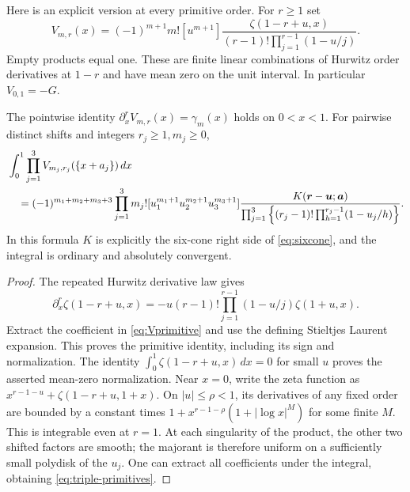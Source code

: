 Here is an explicit version at every primitive order.  For $r\ge1$ set
\begin{equation}\label{eq:Vprimitive}
 V_{m,r}(x)=(-1)^{m+1}m![u^{m+1}]
 \frac{\zeta(1-r+u,x)}{(r-1)!\prod_{j=1}^{r-1}(1-u/j)}.
\end{equation}
Empty products equal one.  These are finite linear combinations of
Hurwitz order derivatives at $1-r$ and have mean zero on the unit
interval.  In particular $V_{0,1}=-G$.
\begin{corollary}
\label{cor:triple-primitives}
The pointwise identity $\partial_x^rV_{m,r}(x)=\gamma_m(x)$ holds on
$0<x<1$.  For pairwise distinct shifts and integers $r_j\ge1,m_j\ge0$,
\begin{align}\label{eq:triple-primitives}
 &\int_0^1\prod_{j=1}^{3}V_{m_j,r_j}(\{x+a_j\})\,dx\notag\\
 &\quad=(-1)^{m_1+m_2+m_3+3}\prod_{j=1}^{3}m_j!
 [u_1^{m_1+1}u_2^{m_2+1}u_3^{m_3+1}]
 \frac{K(\boldsymbol r-\boldsymbol u;\boldsymbol a)}
 {\prod_{j=1}^{3}\left\{(r_j-1)!
                   \prod_{h=1}^{r_j-1}(1-u_j/h)\right\}}.
\end{align}
In this formula $K$ is explicitly the six-cone right side of
\eqref{eq:sixcone}, and the integral is ordinary and absolutely
convergent.
\end{corollary}
\begin{proof}
The repeated Hurwitz derivative law gives
\[
 \partial_x^r\zeta(1-r+u,x)
 =-u(r-1)!\prod_{j=1}^{r-1}(1-u/j)\zeta(1+u,x).
\]
Extract the coefficient in \eqref{eq:Vprimitive} and use the defining
Stieltjes Laurent expansion.  This proves the primitive identity,
including its sign and normalization.  The identity
$\int_0^1\zeta(1-r+u,x)\,dx=0$ for small $u$ proves the asserted
mean-zero normalization.  Near $x=0$, write the zeta function as
$x^{r-1-u}+\zeta(1-r+u,1+x)$.  On $|u|\le\rho<1$, its derivatives
of any fixed order are bounded by a constant times
$1+x^{r-1-\rho}(1+|\log x|^M)$ for some finite $M$.
This is integrable even at $r=1$.  At each singularity of the product,
the other two shifted factors are smooth; the majorant is therefore
uniform on a sufficiently small polydisk of the $u_j$.
One can extract all coefficients under the integral, obtaining
\eqref{eq:triple-primitives}.
\end{proof}
